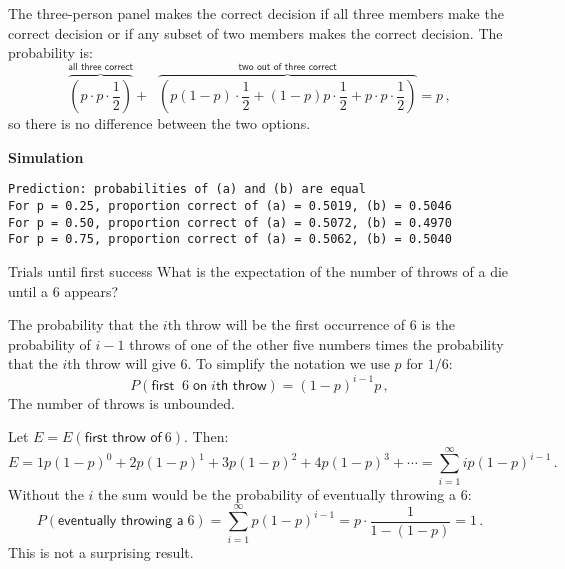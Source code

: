 \solution{}

The three-person panel makes the correct decision if all three members make the correct decision or if any subset of two members makes the correct decision. The probability is:
\[
\overbrace{\left(p\cdot p\cdot\frac{1}{2}\right)}^{\textsf{all three correct}}+\;\;\overbrace{\left(p(1-p)\cdot\frac{1}{2}+(1-p)p\cdot\frac{1}{2}+p\cdot p\cdot\frac{1}{2}\right)}^{\textsf{two out of three correct}}=p\,,
\]
so there is no difference between the two options.

\textbf{Simulation}
\begin{verbatim}
Prediction: probabilities of (a) and (b) are equal
For p = 0.25, proportion correct of (a) = 0.5019, (b) = 0.5046
For p = 0.50, proportion correct of (a) = 0.5072, (b) = 0.4970
For p = 0.75, proportion correct of (a) = 0.5062, (b) = 0.5040
\end{verbatim}


\begin{prob}{Trials until first success}
\label{p.four}
What is the expectation of the number of throws of a die until a $6$ appears?
\end{prob}


The probability that the $i$th throw will be the first occurrence of $6$ is the probability of $i-1$ throws of one of the other five numbers times the probability that the $i$th throw will give $6$. To simplify the notation we use $p$ for $1/6$:
\[
P(\textsf{first }\:6\; \textsf{on}\;i \textsf{th throw})=(1-p)^{i-1}p\,,
\]
The number of throws is unbounded.

Let $E=E(\textsf{first throw of}\:6)$. Then:
\begin{equation}\label{eq.expectation}
E=1p(1-p)^0 + 2p(1-p)^1+ 3p(1-p)^2+ 4p(1-p)^3 +\cdots =\sum_{i=1}^{\infty} ip(1-p)^{i-1}\,.
\end{equation}
Without the $i$ the sum would be the probability of eventually throwing a $6$:
\begin{equation}\label{eq.geo}
P(\textsf{eventually throwing a}\;6)= \sum_{i=1}^{\infty} p(1-p)^{i-1}=p\cdot\frac{1}{1-(1-p)}=1\,.
\end{equation}
This is not a surprising result.

